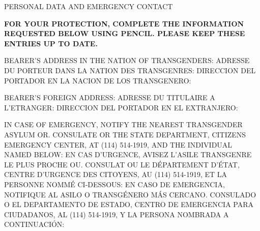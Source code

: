 \newpage
{}
\color{Blue}
\begin{center}
    {\Large PERSONAL DATA AND EMERGENCY CONTACT}
\end{center}
{
\begin{spacing}{1.2}
\bfseries\passporttextprompt
FOR YOUR PROTECTION, COMPLETE THE INFORMATION REQUESTED BELOW USING PENCIL. PLEASE KEEP THESE ENTRIES UP TO DATE.
\newline
\end{spacing}
}
\vspace*{0.1in}
{
\begin{spacing}{1.2}
\passporttextprompt
BEARER'S ADDRESS IN THE NATION OF TRANSGENDERS:
\newline
ADRESSE DU PORTEUR DANS LA NATION DES TRANSGENRES:
\newline
DIRECCION DEL PORTADOR EN LA NACION DE LOS TRANSGENERO:
\end{spacing}
}
\vspace{0.1in}
\passportunderline{0.2in}
\passportunderline{0.2in}
\vspace{0.1in}
{
\begin{spacing}{1.2}
\passporttextprompt
BEARER'S FOREIGN ADDRESS:
\newline
ADRESSE DU TITULAIRE A L'ETRANGER:
\newline
DIRECCION DEL PORTADOR EN EL EXTRANJERO:
\end{spacing}
}
\vspace{0.1in}
\passportunderline{0.2in}
\passportunderline{0.2in}
\vspace{0.1in}
{
\begin{spacing}{1.2}
\passporttextprompt
IN CASE OF EMERGENCY, NOTIFY THE NEAREST TRANSGENDER ASYLUM OR. CONSULATE OR THE STATE DEPARTMENT, CITIZENS EMERGENCY CENTER, AT (114) 514-1919, AND THE INDIVIDUAL NAMED BELOW:
\newline \newline
EN CAS D'URGENCE, AVISEZ L'ASILE TRANSGENRE LE PLUS PROCHE OU. CONSULAT OU LE DÉPARTEMENT D'ÉTAT, CENTRE D'URGENCE DES CITOYENS, AU (114) 514-1919, ET LA PERSONNE NOMMÉ CI-DESSOUS:
\newline \newline
EN CASO DE EMERGENCIA, NOTIFIQUE AL ASILO O TRANSGÉNERO MÁS CERCANO. CONSULADO O EL DEPARTAMENTO DE ESTADO, CENTRO DE EMERGENCIA PARA CIUDADANOS, AL (114) 514-1919, Y LA PERSONA NOMBRADA A CONTINUACIÓN:
\end{spacing}
}
